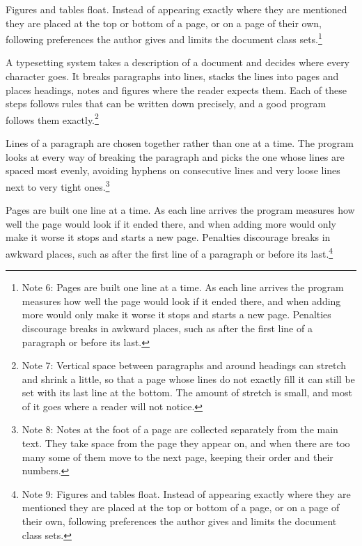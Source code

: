 \documentclass{article}
\begin{document}
Figures and tables float. Instead of appearing exactly where they are mentioned they are placed at the top or bottom of a page, or on a page of their own, following preferences the author gives and limits the document class sets.\footnote{Note 6: Pages are built one line at a time. As each line arrives the program measures how well the page would look if it ended there, and when adding more would only make it worse it stops and starts a new page. Penalties discourage breaks in awkward places, such as after the first line of a paragraph or before its last.}

A typesetting system takes a description of a document and decides where every character goes. It breaks paragraphs into lines, stacks the lines into pages and places headings, notes and figures where the reader expects them. Each of these steps follows rules that can be written down precisely, and a good program follows them exactly.\footnote{Note 7: Vertical space between paragraphs and around headings can stretch and shrink a little, so that a page whose lines do not exactly fill it can still be set with its last line at the bottom. The amount of stretch is small, and most of it goes where a reader will not notice.}

Lines of a paragraph are chosen together rather than one at a time. The program looks at every way of breaking the paragraph and picks the one whose lines are spaced most evenly, avoiding hyphens on consecutive lines and very loose lines next to very tight ones.\footnote{Note 8: Notes at the foot of a page are collected separately from the main text. They take space from the page they appear on, and when there are too many some of them move to the next page, keeping their order and their numbers.}

Pages are built one line at a time. As each line arrives the program measures how well the page would look if it ended there, and when adding more would only make it worse it stops and starts a new page. Penalties discourage breaks in awkward places, such as after the first line of a paragraph or before its last.\footnote{Note 9: Figures and tables float. Instead of appearing exactly where they are mentioned they are placed at the top or bottom of a page, or on a page of their own, following preferences the author gives and limits the document class sets.}
\end{document}
